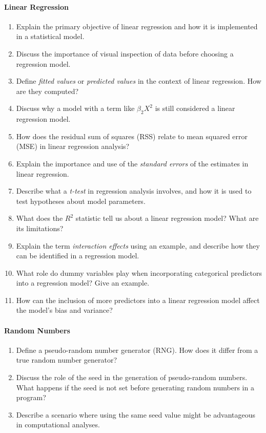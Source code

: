 \paragraph*{Linear Regression}
\begin{enumerate}[nosep]
  \item Explain the primary objective of linear regression and how it is implemented in a statistical model.
  \item Discuss the importance of visual inspection of data before choosing a regression model.
  \item Define \emph{fitted values} or \emph{predicted values} in the context of linear regression. How are they computed?
  \item Discuss why a model with a term like $\beta_2 X^2$ is still considered a linear regression model.
  \item How does the residual sum of squares (RSS) relate to mean squared error (MSE) in linear regression analysis?
  \item Explain the importance and use of the \emph{standard errors} of the estimates in linear regression.
  \item Describe what a \emph{t-test} in regression analysis involves, and how it is used to test hypotheses about model parameters.
  \item What does the $R^2$ statistic tell us about a linear regression model? What are its limitations?
  \item Explain the term \emph{interaction effects} using an example, and describe how they can be identified in a regression model.
  \item What role do dummy variables play when incorporating categorical predictors into a regression model? Give an example.
  \item How can the inclusion of more predictors into a linear regression model affect the model's bias and variance?
\end{enumerate}
\paragraph*{Random Numbers}
\begin{enumerate}
  \item Define a pseudo-random number generator (RNG). How does it differ from a true random number generator?
  \item Discuss the role of the seed in the generation of pseudo-random numbers. What happens if the seed is not set before generating random numbers in a program?
  \item Describe a scenario where using the same seed value might be advantageous in computational analyses.
\end{enumerate}
